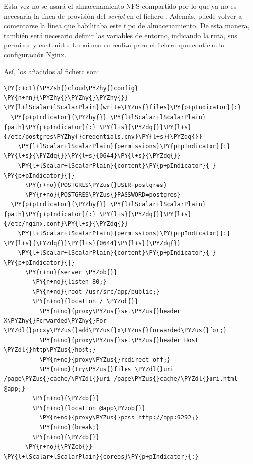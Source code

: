 Esta vez no se usará el almacenamiento NFS compartido por lo que ya no es necesaria la línea de provisión del \textit{script} en el fichero . Además, puede volver a comentarse la línea que habilitaba este tipo de almacenamiento. De esta manera, también será necesario definir las variables de entorno, indicando la ruta, sus permisos y contenido. Lo mismo se realiza para el fichero que contiene la configuración Nginx.

Así, los añadidos al fichero  son:

\begin{codelisting}
\label{code:vagrantfile2}
\begin{Verbatim}[fontsize=\relsize{-2.5},fontseries=b,commandchars=\\\{\}]
\PY{c+c1}{\PYZsh{}cloud\PYZhy{}config}
\PY{n+nn}{\PYZhy{}\PYZhy{}\PYZhy{}}
\PY{l+lScalar+lScalarPlain}{write\PYZus{}files}\PY{p+pIndicator}{:}
  \PY{p+pIndicator}{\PYZhy{}} \PY{l+lScalar+lScalarPlain}{path}\PY{p+pIndicator}{:} \PY{l+s}{\PYZdq{}}\PY{l+s}{/etc/postgres\PYZhy{}credentials.env}\PY{l+s}{\PYZdq{}}
    \PY{l+lScalar+lScalarPlain}{permissions}\PY{p+pIndicator}{:} \PY{l+s}{\PYZdq{}}\PY{l+s}{0644}\PY{l+s}{\PYZdq{}}
    \PY{l+lScalar+lScalarPlain}{content}\PY{p+pIndicator}{:} \PY{p+pIndicator}{|}
      \PY{n+no}{POSTGRES\PYZus{}USER=postgres}
      \PY{n+no}{POSTGRES\PYZus{}PASSWORD=postgres}
  \PY{p+pIndicator}{\PYZhy{}} \PY{l+lScalar+lScalarPlain}{path}\PY{p+pIndicator}{:} \PY{l+s}{\PYZdq{}}\PY{l+s}{/etc/nginx.conf}\PY{l+s}{\PYZdq{}}
    \PY{l+lScalar+lScalarPlain}{permissions}\PY{p+pIndicator}{:} \PY{l+s}{\PYZdq{}}\PY{l+s}{0644}\PY{l+s}{\PYZdq{}}
    \PY{l+lScalar+lScalarPlain}{content}\PY{p+pIndicator}{:} \PY{p+pIndicator}{|}
      \PY{n+no}{server \PYZob{}}
        \PY{n+no}{listen 80;}
        \PY{n+no}{root /usr/src/app/public;}
        \PY{n+no}{location / \PYZob{}}
          \PY{n+no}{proxy\PYZus{}set\PYZus{}header X\PYZhy{}Forwarded\PYZhy{}For \PYZdl{}proxy\PYZus{}add\PYZus{}x\PYZus{}forwarded\PYZus{}for;}
          \PY{n+no}{proxy\PYZus{}set\PYZus{}header Host \PYZdl{}http\PYZus{}host;}
          \PY{n+no}{proxy\PYZus{}redirect off;}
          \PY{n+no}{try\PYZus{}files \PYZdl{}uri /page\PYZus{}cache/\PYZdl{}uri /page\PYZus{}cache/\PYZdl{}uri.html @app;}
        \PY{n+no}{\PYZcb{}}
        \PY{n+no}{location @app\PYZob{}}
          \PY{n+no}{proxy\PYZus{}pass http://app:9292;}
          \PY{n+no}{break;}
        \PY{n+no}{\PYZcb{}}
      \PY{n+no}{\PYZcb{}}
\PY{l+lScalar+lScalarPlain}{coreos}\PY{p+pIndicator}{:}

\end{Verbatim}
\end{codelisting}
